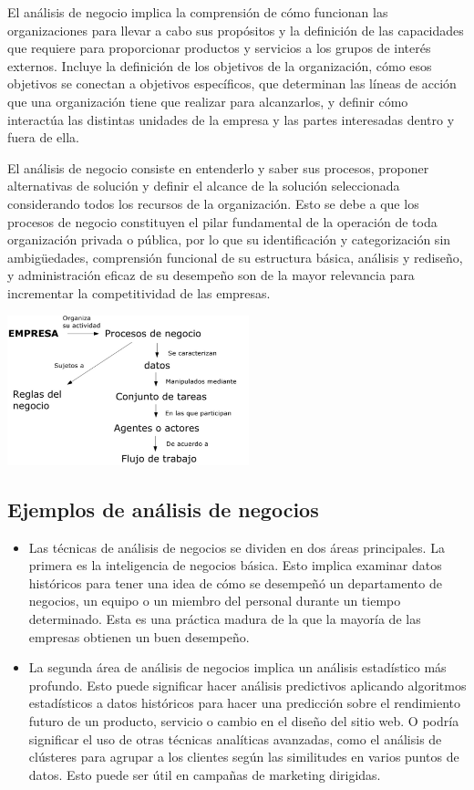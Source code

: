 \documentclass[twoside,twocolumn]{article}
\begin{document}
El análisis de negocio implica la comprensión de cómo funcionan las organizaciones para llevar a cabo sus propósitos y la definición de las capacidades que requiere para proporcionar productos y servicios a los grupos de interés externos. Incluye la definición de los objetivos de la organización, cómo esos objetivos se conectan a objetivos específicos, que determinan las líneas de acción que una organización tiene que realizar para alcanzarlos, y definir cómo interactúa las distintas unidades de la empresa y las partes interesadas dentro y fuera de ella.

El análisis de negocio consiste en entenderlo y saber sus procesos, proponer alternativas de solución y definir el alcance de la solución seleccionada considerando todos los recursos de la organización. Esto se debe a que los procesos de negocio constituyen el pilar fundamental de la operación de toda organización privada o pública, por lo que su identificación y categorización sin ambigüedades, comprensión funcional de su estructura básica, análisis y rediseño, y administración eficaz de su desempeño son de la mayor relevancia para incrementar la competitividad de las empresas.


\begin{center}
	\includegraphics[width=7cm]{./Imagenes/AnalisisNegocio} 
\end{center}


\subsection{Ejemplos de análisis de negocios}

\begin{itemize}	
	\item Las técnicas de análisis de negocios se dividen en dos áreas principales. La primera es la inteligencia de negocios básica. Esto implica examinar datos históricos para tener una idea de cómo se desempeñó un departamento de negocios, un equipo o un miembro del personal durante un tiempo determinado. Esta es una práctica madura de la que la mayoría de las empresas obtienen un buen desempeño.
	\item La segunda área de análisis de negocios implica un análisis estadístico más profundo. Esto puede significar hacer análisis predictivos aplicando algoritmos estadísticos a datos históricos para hacer una predicción sobre el rendimiento futuro de un producto, servicio o cambio en el diseño del sitio web. O podría significar el uso de otras técnicas analíticas avanzadas, como el análisis de clústeres para agrupar a los clientes según las similitudes en varios puntos de datos. Esto puede ser útil en campañas de marketing dirigidas.
\end{itemize} 
\end{document}
